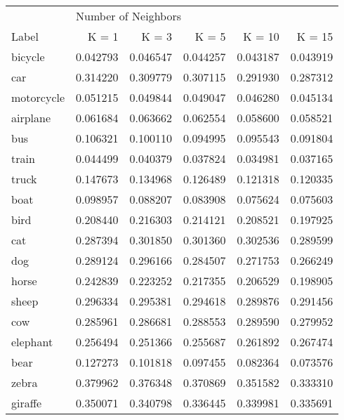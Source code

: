 \begin{tabular}{lrrrrr}
\toprule
            & \multicolumn{5}{l}{Number of Neighbors} \\
      Label &               K = 1 &     K = 3 &     K = 5 &    K = 10 &    K = 15 \\
\midrule
    bicycle &            0.042793 &  0.046547 &  0.044257 &  0.043187 &  0.043919 \\
        car &            0.314220 &  0.309779 &  0.307115 &  0.291930 &  0.287312 \\
 motorcycle &            0.051215 &  0.049844 &  0.049047 &  0.046280 &  0.045134 \\
   airplane &            0.061684 &  0.063662 &  0.062554 &  0.058600 &  0.058521 \\
        bus &            0.106321 &  0.100110 &  0.094995 &  0.095543 &  0.091804 \\
      train &            0.044499 &  0.040379 &  0.037824 &  0.034981 &  0.037165 \\
      truck &            0.147673 &  0.134968 &  0.126489 &  0.121318 &  0.120335 \\
       boat &            0.098957 &  0.088207 &  0.083908 &  0.075624 &  0.075603 \\
       bird &            0.208440 &  0.216303 &  0.214121 &  0.208521 &  0.197925 \\
        cat &            0.287394 &  0.301850 &  0.301360 &  0.302536 &  0.289599 \\
        dog &            0.289124 &  0.296166 &  0.284507 &  0.271753 &  0.266249 \\
      horse &            0.242839 &  0.223252 &  0.217355 &  0.206529 &  0.198905 \\
      sheep &            0.296334 &  0.295381 &  0.294618 &  0.289876 &  0.291456 \\
        cow &            0.285961 &  0.286681 &  0.288553 &  0.289590 &  0.279952 \\
   elephant &            0.256494 &  0.251366 &  0.255687 &  0.261892 &  0.267474 \\
       bear &            0.127273 &  0.101818 &  0.097455 &  0.082364 &  0.073576 \\
      zebra &            0.379962 &  0.376348 &  0.370869 &  0.351582 &  0.333310 \\
    giraffe &            0.350071 &  0.340798 &  0.336445 &  0.339981 &  0.335691 \\
\bottomrule
\end{tabular}
